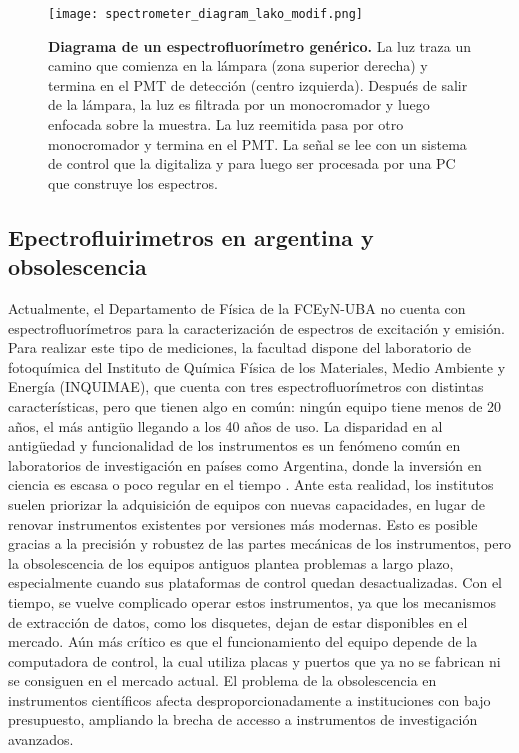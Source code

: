\begin{SCfigure}
     \centering
     \texttt{[image: spectrometer\_diagram\_lako\_modif.png]}
     \caption{
    \textbf{Diagrama de un espectrofluorímetro genérico.}
    La luz traza un camino que comienza en la lámpara (zona superior derecha) y termina en el PMT de detección (centro izquierda). Después de salir de la lámpara, la luz es filtrada por un monocromador y luego enfocada sobre la muestra. La luz reemitida pasa por otro monocromador y termina en el PMT. La señal se lee con un sistema de control que la digitaliza y para luego ser procesada por una PC que construye los espectros.
    }
     \label{fig:spec_diagram_lako}
\end{SCfigure}



\subsection{Epectrofluirimetros en argentina y obsolescencia}

Actualmente, el Departamento de Física de la FCEyN-UBA no cuenta con espectrofluorímetros para la caracterización de espectros de excitación y emisión.  
Para realizar este tipo de mediciones, la facultad dispone del laboratorio de fotoquímica del Instituto de Química Física de los Materiales, Medio Ambiente y Energía (INQUIMAE), que cuenta con tres espectrofluorímetros con distintas características, pero que tienen algo en común: ningún equipo tiene menos de 20 años, el más antigüo llegando a los 40 años de uso.
La disparidad en al antigüedad y funcionalidad de los instrumentos es un fenómeno común en laboratorios de investigación en países como Argentina, donde la inversión en ciencia es escasa o poco regular en el tiempo \cite{cioccaRealityScientificResearch2017}. 
Ante esta realidad, los institutos suelen priorizar la adquisición de equipos con nuevas capacidades, en lugar de renovar instrumentos existentes por versiones más modernas.  
Esto es posible gracias a la precisión y robustez de las partes mecánicas de los instrumentos, pero la obsolescencia de los equipos antiguos plantea problemas a largo plazo, especialmente cuando sus plataformas de control quedan desactualizadas.  
Con el tiempo, se vuelve complicado operar estos instrumentos, ya que los mecanismos de extracción de datos, como los disquetes, dejan de estar disponibles en el mercado. 
Aún más crítico es que el funcionamiento del equipo depende de la computadora de control, la cual utiliza placas y puertos que ya no se fabrican ni se consiguen en el mercado actual.  
El problema de la obsolescencia en instrumentos científicos afecta desproporcionadamente a instituciones con bajo presupuesto, ampliando la brecha de accesso a instrumentos de investigación avanzados.


